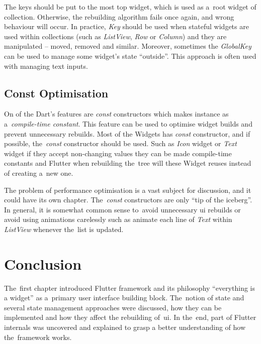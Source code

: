 The keys should be put to the most top widget, which is used as a~root widget of collection. Otherwise, the rebuilding algorithm fails once again, and wrong behaviour will occur. In practice, \textit{Key} should be used when stateful widgets are used within collections (such as \textit{ListView}, \textit{Row} or \textit{Column}) and they are manipulated -- moved, removed and similar. Moreover, sometimes the \textit{GlobalKey} can be used to manage some widget's state ``outside''. This approach is often used with managing text inputs. 
\subsection{Const Optimisation}
On of the Dart's features are \textit{const} constructors which makes instance as a~\textit{compile-time constant}. This feature can be used to optimise widget builds and prevent unnecessary rebuilds. Most of the Widgets has \textit{const} constructor, and if possible, the~\textit{const} constructor should be used. Such as \textit{Icon} widget or \textit{Text} widget if they accept non-changing values they can be made compile-time constants and Flutter when rebuilding the~tree will these Widget reuses instead of creating a~new one. 

The problem of performance optimisation is a vast subject for discussion, and it could have its own chapter. The~\textit{const} constructors are only ``tip of the iceberg''. In general, it is somewhat common sense to~avoid unnecessary \gls{ui} rebuilds or avoid using animations carelessly such as animate each line of \textit{Text} within \textit{ListView} whenever the~list is updated. 

\section{Conclusion}
The~first chapter introduced Flutter framework and its philosophy ``everything is a widget'' as a~primary user interface building block. The~notion of state and several state management approaches were discussed, how they can be implemented and how they affect the rebuilding of~\gls{ui}. In the~end, part of Flutter internals was uncovered and explained to grasp a better understanding of how the~framework works.